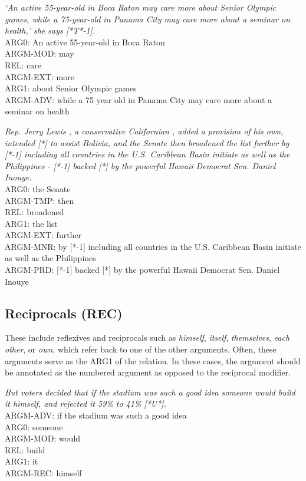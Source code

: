 \documentclass[11pt]{report}
\begin{document}
\textit{`An active 55-year-old in Boca Raton may care more about Senior Olympic games, while a 75-year-old in Panama City may care more about a seminar on health,' she says [*T*-1].}\\
ARG0:        An active 55-year-old in Boca Raton\\ 
ARGM-MOD:        may \\
REL:       	 care \\
ARGM-EXT:        more\\ 
ARG1:        about Senior Olympic games\\ 
ARGM-ADV: while a 75 year old in Panama City may care more about a seminar on health

\textit{Rep. Jerry Lewis , a conservative Californian , added a provision of his own, intended [*] to assist Bolivia, and the Senate then broadened the list further by [*-1] including all countries in the U.S. Caribbean Basin initiate as well as the Philippines - [*-1] backed [*] by the powerful Hawaii Democrat Sen. Daniel Inouye.}\\
ARG0:        the Senate \\
ARGM-TMP:        then \\
REL:        broadened \\
ARG1:        the list \\
ARGM-EXT:        further \\
ARGM-MNR:        by [*-1] including all countries in the U.S. Caribbean Basin initiate as well as the Philippines \\
ARGM-PRD:        [*-1] backed [*] by the powerful Hawaii Democrat Sen. Daniel Inouye 

\subsection{Reciprocals (REC)}
\label{ssec: REC}

These include reflexives and reciprocals such as \textit{himself}, \textit{itself}, \textit{themselves}, \textit{each other}, or \textit{own}, which refer back to one of the other arguments. Often, these arguments serve as the ARG1 of the relation. In these cases, the argument should be annotated as the numbered argument as opposed to the reciprocal modifier. 

\textit{But voters decided that if the stadium was such a good idea someone would build it himself, and rejected it 59\% to 41\% [*U*].}\\
ARGM-ADV:        if the stadium was such a good idea \\
ARG0:        someone \\
ARGM-MOD:        would \\
REL:        build \\
ARG1:        it \\
ARGM-REC:        himself 
\end{document}
